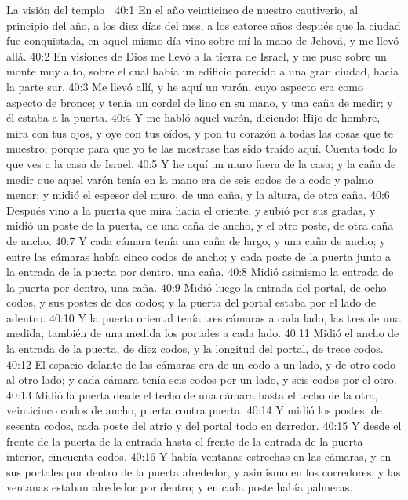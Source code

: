 La visión del templo  

40:1 En el año veinticinco de nuestro cautiverio, al principio del año, a los diez días del mes, a los catorce años después que la ciudad fue conquistada, en aquel mismo día vino sobre mí la mano de Jehová, y me llevó allá.  
40:2 En visiones de Dios me llevó a la tierra de Israel, y me puso sobre un monte muy alto, sobre el cual había un edificio parecido a una gran ciudad, hacia la parte sur. 
40:3 Me llevó allí, y he aquí un varón, cuyo aspecto era como aspecto de bronce; y tenía un cordel de lino en su mano, y una caña de medir; y él estaba a la puerta.  
40:4 Y me habló aquel varón, diciendo: Hijo de hombre, mira con tus ojos, y oye con tus oídos, y pon tu corazón a todas las cosas que te muestro; porque para que yo te las mostrase has sido traído aquí. Cuenta todo lo que ves a la casa de Israel.  
40:5 Y he aquí un muro fuera de la casa; y la caña de medir que aquel varón tenía en la mano era de seis codos   de a codo y palmo menor; y midió el espesor del muro, de una caña, y la altura, de otra caña.  
40:6 Después vino a la puerta que mira hacia el oriente, y subió por sus gradas, y midió un poste de la puerta, de una caña  de ancho, y el otro poste, de otra caña de ancho.  
40:7 Y cada cámara tenía una caña   de largo, y una caña de ancho; y entre las cámaras había cinco codos de ancho; y cada poste de la puerta junto a la entrada de la puerta por dentro, una caña.  
40:8 Midió asimismo la entrada de la puerta por dentro, una caña.  
40:9 Midió luego la entrada del portal, de ocho codos,  y sus postes de dos codos; y la puerta del portal estaba por el lado de adentro.  
40:10 Y la puerta oriental tenía tres cámaras a cada lado, las tres de una medida; también de una medida los portales a cada lado.  
40:11 Midió el ancho de la entrada de la puerta, de diez codos,  y la longitud del portal, de trece codos.  
40:12 El espacio delante de las cámaras era de un codo   a un lado, y de otro codo al otro lado; y cada cámara tenía seis codos por un lado, y seis codos por el otro.  
40:13 Midió la puerta desde el techo de una cámara hasta el techo de la otra, veinticinco codos   de ancho, puerta contra puerta.  
40:14 Y midió los postes, de sesenta codos,  cada poste del atrio y del portal todo en derredor.  
40:15 Y desde el frente de la puerta de la entrada hasta el frente de la entrada de la puerta interior, cincuenta codos.  
40:16 Y había ventanas estrechas en las cámaras, y en sus portales por dentro de la puerta alrededor, y asimismo en los corredores; y las ventanas estaban alrededor por dentro; y en cada poste había palmeras.  
